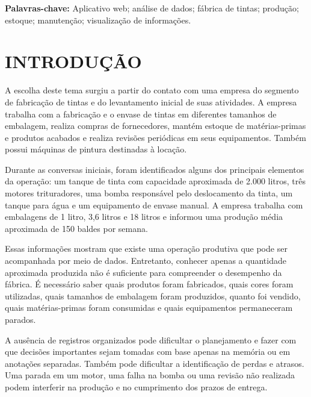\documentclass[12pt,a4paper]{article}
\begin{document}
\vspace{2cm}

\textbf{Palavras-chave:} Aplicativo web; análise de dados; fábrica de tintas; produção; estoque; manutenção; visualização de informações.

\clearpage
\listoffigures

\clearpage
\tableofcontents

\clearpage
\pagestyle{fancy}
\section{INTRODUÇÃO}
\enlargethispage{-4\baselineskip}
A escolha deste tema surgiu a partir do contato com uma empresa do segmento de fabricação de tintas e do levantamento inicial de suas atividades. A empresa trabalha com a fabricação e o envase de tintas em diferentes tamanhos de embalagem, realiza compras de fornecedores, mantém estoque de matérias-primas e produtos acabados e realiza revisões periódicas em seus equipamentos. Também possui máquinas de pintura destinadas à locação.

Durante as conversas iniciais, foram identificados alguns dos principais elementos da operação: um tanque de tinta com capacidade aproximada de 2.000 litros, três motores trituradores, uma bomba responsável pelo deslocamento da tinta, um tanque para água e um equipamento de envase manual. A empresa trabalha com embalagens de 1 litro, 3,6 litros e 18 litros e informou uma produção média aproximada de 150 baldes por semana.

Essas informações mostram que existe uma operação produtiva que pode ser acompanhada por meio de dados. Entretanto, conhecer apenas a quantidade aproximada produzida não é suficiente para compreender o desempenho da fábrica. É necessário saber quais produtos foram fabricados, quais cores foram utilizadas, quais tamanhos de embalagem foram produzidos, quanto foi vendido, quais matérias-primas foram consumidas e quais equipamentos permaneceram parados.

A ausência de registros organizados pode dificultar o planejamento e fazer com que decisões importantes sejam tomadas com base apenas na memória ou em anotações separadas. Também pode dificultar a identificação de perdas e atrasos. Uma parada em um motor, uma falha na bomba ou uma revisão não realizada podem interferir na produção e no cumprimento dos prazos de entrega.
\end{document}
